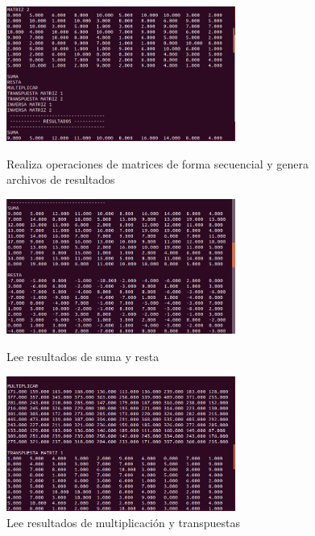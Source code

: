 \documentclass[12pt]{article}
\begin{document}
\begin{itemize}
\begin{itemize}
\begin{figure}[h!]
                                
                               \end{figure}
                               \newpage
                               \begin{figure}[h!]
                                \centering
                               \includegraphics[width=0.67\textwidth]{Practica4/Images/Linux/5_2.png}
                                \caption{Realiza operaciones de matrices de forma secuencial y genera archivos de resultados}
                                \includegraphics[width=0.67\textwidth]{Practica4/Images/Linux/5_3.png}
                                \caption{Lee resultados de suma y resta}
                                
                                \includegraphics[width=0.67\textwidth]{Practica4/Images/Linux/5_4.png}
                                \caption{Lee resultados de multiplicación y transpuestas}
                                

\end{figure}
\end{itemize}
\end{itemize}
\end{document}
